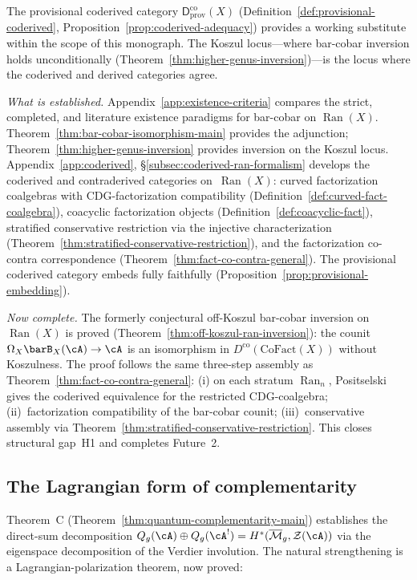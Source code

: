 The provisional coderived category
$\mathsf{D}^{\mathrm{co}}_{\mathrm{prov}}(X)$
(Definition~\ref{def:provisional-coderived},
Proposition~\ref{prop:coderived-adequacy})
provides a working substitute within the scope of this monograph.
The Koszul locus---where bar-cobar inversion
holds unconditionally (Theorem~\ref{thm:higher-genus-inversion})---is
the locus where the coderived and derived categories agree.

\emph{What is established.}
Appendix~\ref{app:existence-criteria} compares the strict,
completed, and literature existence paradigms for bar-cobar on
$\operatorname{Ran}(X)$.  Theorem~\ref{thm:bar-cobar-isomorphism-main}
provides the adjunction; Theorem~\ref{thm:higher-genus-inversion}
provides inversion on the Koszul locus.
Appendix~\ref{app:coderived},
\S\ref{subsec:coderived-ran-formalism} develops the coderived
and contraderived categories on~$\operatorname{Ran}(X)$: curved
factorization coalgebras with CDG-factorization compatibility
(Definition~\ref{def:curved-fact-coalgebra}), coacyclic
factorization objects
(Definition~\ref{def:coacyclic-fact}), stratified conservative
restriction via the injective characterization
(Theorem~\ref{thm:stratified-conservative-restriction}),
and the factorization co-contra correspondence
(Theorem~\ref{thm:fact-co-contra-general}).  The provisional
coderived category embeds fully faithfully
(Proposition~\ref{prop:provisional-embedding}).

\emph{Now complete.}
The formerly conjectural off-Koszul bar-cobar inversion on
$\operatorname{Ran}(X)$ is proved
(Theorem~\ref{thm:off-koszul-ran-inversion}): the counit
$\Omega_X \barB_X(\cA) \to \cA$ is an isomorphism in
$D^{\mathrm{co}}(\mathrm{CoFact}(X))$ without Koszulness.
The proof follows the same three-step assembly as
Theorem~\ref{thm:fact-co-contra-general}: (i) on each stratum
$\operatorname{Ran}_n$, Positselski~\cite[Theorem~7.2]{Positselski11}
gives the coderived equivalence for the restricted CDG-coalgebra;
(ii)~factorization compatibility of the bar-cobar counit;
(iii)~conservative assembly via
Theorem~\ref{thm:stratified-conservative-restriction}.
This closes structural gap~H1 and completes Future~2.

\subsection{The Lagrangian form of complementarity}

Theorem~C (Theorem~\ref{thm:quantum-complementarity-main}) establishes
the direct-sum decomposition
$Q_g(\cA) \oplus Q_g(\cA^!)
= H^*(\overline{\mathcal{M}}_g, \mathcal{Z}(\cA))$
via the eigenspace decomposition of the Verdier involution.
The natural strengthening is a Lagrangian-polarization theorem,
now proved:

